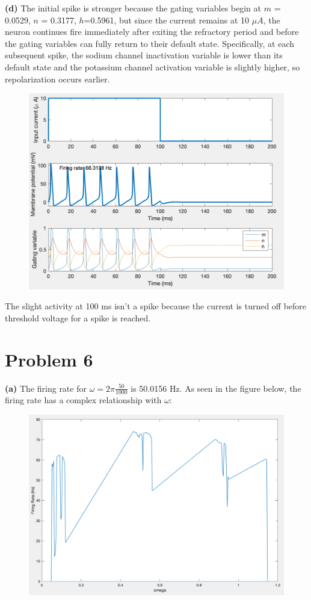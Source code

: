 \documentclass[]{article}
\begin{document}
\textbf{(d)} The initial spike is stronger because the gating variables begin at $m$ = 0.0529, $n$ = 0.3177, $h$=0.5961, but since the current remains at 10 $\mu A$, the neuron continues fire immediately after exiting the refractory period and before the gating variables can fully return to their default state. Specifically, at each subsequent spike, the sodium channel inactivation variable is lower than its default state and the potassium channel activation variable is slightly higher, so repolarization occurs earlier.

\begin{figure}
    \centering
    \includegraphics[scale=0.75]{history_dependence.png}
    \label{fig:history}
\end{figure}

The slight activity at 100 ms isn't a spike because the current is turned off before threshold voltage for a spike is reached.

\section*{Problem 6}
\textbf{(a)} The firing rate for $\omega = 2\pi\frac{50}{1000}$ is 50.0156 Hz. As seen in the figure below, the firing rate has a complex relationship with $\omega$:
\begin{figure}
    \centering
    \includegraphics[scale=0.4]{omega.png}
    \label{fig:omega}
\end{figure}
\end{document}
